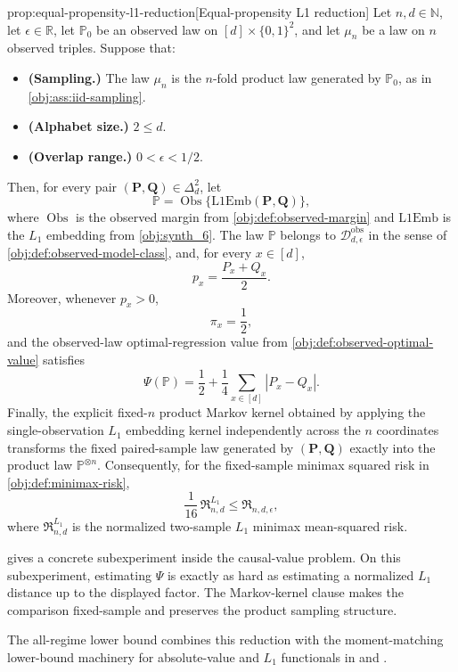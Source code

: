 \documentclass[11pt]{article}
\begin{document}
\begin{propositionv}{prop:equal-propensity-l1-reduction}[Equal-propensity L1 reduction]
Let \(n,d\in\mathbb N\), let \(\epsilon\in\mathbb R\), let \(\mathbb P_0\) be an observed law on \([d]\times\{0,1\}^2\), and let \(\mu_n\) be a law on \(n\) observed triples. Suppose that:
\begin{itemize}
\item \textbf{(Sampling.)} The law \(\mu_n\) is the \(n\)-fold product law generated by \(\mathbb P_0\), as in \cref{obj:ass:iid-sampling}.
\item \textbf{(Alphabet size.)} \(2\le d\).
\item \textbf{(Overlap range.)} \(0<\epsilon<1/2\).
\end{itemize}
Then, for every pair \((\mathbf P,\mathbf Q)\in\Delta_d^2\), let
\[
\mathbb P=\operatorname{Obs}\{\mathrm{L1Emb}(\mathbf P,\mathbf Q)\},
\]
where \(\operatorname{Obs}\) is the observed margin from \cref{obj:def:observed-margin} and \(\mathrm{L1Emb}\) is the \(L_1\) embedding from \cref{obj:synth_6}. The law \(\mathbb P\) belongs to \(\mathcal D_{d,\epsilon}^{\mathrm{obs}}\) in the sense of \cref{obj:def:observed-model-class}, and, for every \(x\in[d]\),
\[
p_x=\frac{P_x+Q_x}{2}.
\]
Moreover, whenever \(p_x>0\),
\[
\pi_x=\frac12,
\]
and the observed-law optimal-regression value from \cref{obj:def:observed-optimal-value} satisfies
\[
\Psi(\mathbb P)=\frac12+\frac14\sum_{x\in[d]} |P_x-Q_x|.
\]
Finally, the explicit fixed-\(n\) product Markov kernel obtained by applying the single-observation \(L_1\) embedding kernel independently across the \(n\) coordinates transforms the fixed paired-sample law generated by \((\mathbf P,\mathbf Q)\) exactly into the product law \(\mathbb P^{\otimes n}\). Consequently, for the fixed-sample minimax squared risk in \cref{obj:def:minimax-risk},
\[
\frac{1}{16}\,\mathfrak R^{L_1}_{n,d}\le \mathfrak R_{n,d,\epsilon},
\]
where \(\mathfrak R^{L_1}_{n,d}\) is the normalized two-sample \(L_1\) minimax mean-squared risk.
\end{propositionv}

 gives a concrete subexperiment inside the causal-value problem. On this subexperiment, estimating \(\Psi\) is exactly as hard as estimating a normalized \(L_1\) distance up to the displayed factor. The Markov-kernel clause makes the comparison fixed-sample and preserves the product sampling structure.

The all-regime lower bound combines this reduction with the moment-matching lower-bound machinery for absolute-value and \(L_1\) functionals in \citet[Lemma 1 and Section 3.1]{CaiLow2011L1} and \citet[Theorem 3 and equation (24)]{JiaoHanWeissman2018L1}.
\end{document}
